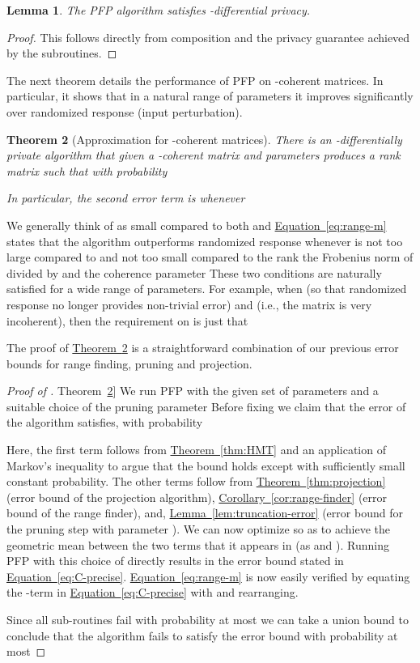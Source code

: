 \documentclass[letterpaper,11pt]{article}
\newtheorem{theorem}{Theorem}[section]
\newtheorem{lemma}[theorem]{Lemma}
\theoremstyle{definition}
\newcommand{\corollaryref}[1]{\hyperref[cor:#1]{Corollary~\ref{cor:#1}}}
\newcommand{\equationref}[1]{\hyperref[eq:#1]{Equation~\ref{eq:#1}}}
\newcommand{\lemmaref}[1]{\hyperref[lem:#1]{Lemma~\ref{lem:#1}}}
\newcommand{\theoremlabel}[1]{\label{thm:#1}}
\newcommand{\theoremref}[1]{\hyperref[thm:#1]{Theorem~\ref{thm:#1}}}
\newcommand{\PFP}{\textrm{\small PFP}\xspace}
\begin{document}
\begin{lemma}
The \PFP algorithm satisfies -differential privacy.
\end{lemma}

\begin{proof}
This follows directly from composition and the privacy guarantee achieved by
the subroutines.
\end{proof}

The next theorem details the performance of \PFP on -coherent matrices. In
particular, it shows that in a natural range of parameters it improves
significantly over randomized response (input perturbation).

\begin{theorem}[Approximation for -coherent matrices]
\theoremlabel{C-approx}
There is an -differentially private algorithm that
given a -coherent matrix  and parameters
 produces a rank  matrix  such that with
probability 

In particular, the second error term is  whenever

\end{theorem}
We generally think of  as small compared to both  and 
\equationref{range-m} states that the algorithm outperforms randomized
response whenever  is not too large compared to  and not too small
compared to the rank  the Frobenius norm of  divided by 
and the coherence parameter  These two conditions are
naturally satisfied for a wide range of parameters. For example, when
 (so that randomized response no longer provides
non-trivial error) and  (i.e., the matrix is very incoherent), then
the requirement on  is just that

The proof of
\theoremref{C-approx} is a straightforward combination of our previous
error bounds for range finding, pruning and projection.
\begin{proof}[Proof of \theoremref{C-approx}]
We run \PFP with the given set of parameters 
and a suitable choice of the pruning parameter 
Before fixing  we claim that the error of the algorithm satisfies,
with probability 

Here, the first term follows from \theoremref{HMT} and an application of
Markov's inequality to argue that the bound holds except with sufficiently
small constant probability. The other terms
follow from \theoremref{projection} (error bound of the
projection algorithm), \corollaryref{range-finder} (error bound of the range
finder), and, \lemmaref{truncation-error} (error bound for the pruning step
with parameter ). We can now optimize  so as to achieve the
geometric mean between the two terms that it appears in (as  and
). Running \PFP with this choice of  directly results
in the error bound stated in
\equationref{C-precise}. \equationref{range-m} is now easily verified by
equating the -term in \equationref{C-precise} with
 and rearranging.

Since all sub-routines fail with probability at most  we can take a
union bound to conclude that the algorithm fails to satisfy the error bound
with probability at most 
\end{proof}
\end{document}
